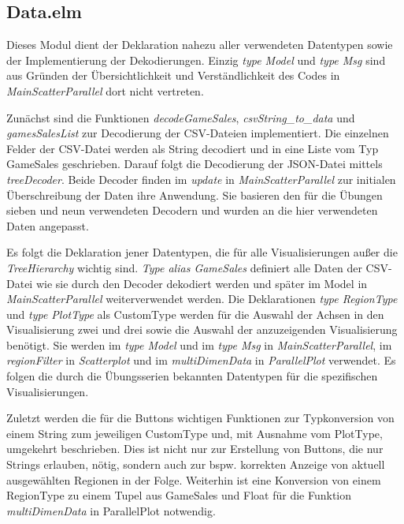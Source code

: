 \documentclass[usegeometry=true]{scrartcl}
\begin{document}
\subsection{Data.elm}
Dieses Modul dient der Deklaration nahezu aller verwendeten Datentypen sowie der Implementierung der Dekodierungen. 
Einzig \textit{type Model} und \textit{type Msg} sind aus Gründen der Übersichtlichkeit und Verständlichkeit des Codes in \textit{MainScatterParallel} dort nicht vertreten. 

Zunächst sind die Funktionen \textit{decodeGameSales}, \textit{csvString\_to\_data} und \textit{gamesSalesList} zur Decodierung der CSV-Dateien implementiert. 
Die einzelnen Felder der CSV-Datei werden als String decodiert und in eine Liste vom Typ GameSales geschrieben.
Darauf folgt die Decodierung der JSON-Datei mittels \textit{treeDecoder}.
Beide Decoder finden im \textit{update} in \textit{MainScatterParallel} zur initialen Überschreibung der Daten ihre Anwendung.
Sie basieren den für die Übungen sieben und neun verwendeten Decodern und wurden an die hier verwendeten Daten angepasst.

Es folgt die Deklaration jener Datentypen, die für alle Visualisierungen außer die \textit{TreeHierarchy} wichtig sind. 
\textit{Type alias GameSales} definiert alle Daten der CSV-Datei wie sie durch den Decoder dekodiert werden und später im Model in \textit{MainScatterParallel} weiterverwendet werden. 
Die Deklarationen \textit{type RegionType} und \textit{type PlotType} als CustomType werden für die Auswahl der Achsen in den Visualisierung zwei und drei sowie die Auswahl der anzuzeigenden Visualisierung benötigt. 
Sie werden im \textit{type Model} und im \textit{type Msg} in \textit{MainScatterParallel}, im \textit{regionFilter} in \textit{Scatterplot} und im \textit{multiDimenData} in \textit{ParallelPlot} verwendet. 
Es folgen die durch die Übungsserien bekannten Datentypen für die spezifischen Visualisierungen. 

Zuletzt werden die für die Buttons wichtigen Funktionen zur Typkonversion von einem String zum jeweiligen CustomType und, mit Ausnahme vom PlotType, umgekehrt beschrieben. 
Dies ist nicht nur zur Erstellung von Buttons, die nur Strings erlauben, nötig, sondern auch zur bspw. korrekten Anzeige von aktuell ausgewählten Regionen in der Folge.
Weiterhin ist eine Konversion von einem RegionType zu einem Tupel aus GameSales und Float für die Funktion \textit{multiDimenData} in ParallelPlot notwendig.
\end{document}

